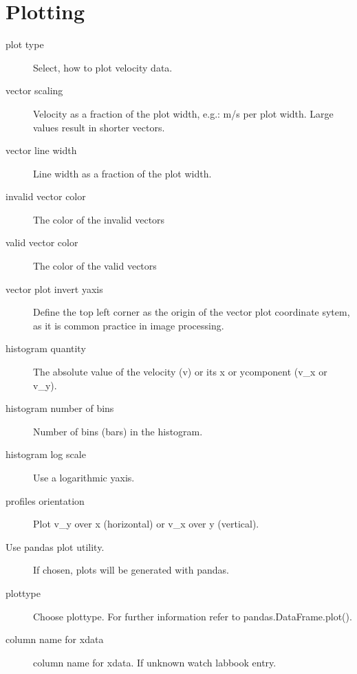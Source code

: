 \documentclass[letterpaper,10pt,english]{sphinxmanual}
\begin{document}
\section{Plotting}
\label{\detokenize{parameters:plotting}}\begin{description}
\item[{plot type}] \leavevmode
Select, how to plot velocity data.

\item[{vector scaling}] \leavevmode
Velocity as a fraction of the plot width, e.g.: m/s per plot width. Large values result in shorter vectors.

\item[{vector line width}] \leavevmode
Line width as a fraction of the plot width.

\item[{invalid vector color}] \leavevmode
The color of the invalid vectors

\item[{valid vector color}] \leavevmode
The color of the valid vectors

\item[{vector plot invert y\sphinxhyphen{}axis}] \leavevmode
Define the top left corner as the origin of the vector plot coordinate sytem, as it is common practice in image processing.

\item[{histogram quantity}] \leavevmode
The absolute value of the velocity (v) or its x\sphinxhyphen{} or y\sphinxhyphen{}component (v\_x or v\_y).

\item[{histogram number of bins}] \leavevmode
Number of bins (bars) in the histogram.

\item[{histogram log scale}] \leavevmode
Use a logarithmic y\sphinxhyphen{}axis.

\item[{profiles orientation}] \leavevmode
Plot v\_y over x (horizontal) or v\_x over y (vertical).

\item[{Use pandas plot utility.}] \leavevmode
If chosen, plots will be generated with pandas.

\item[{plot\sphinxhyphen{}type}] \leavevmode
Choose plot\sphinxhyphen{}type. For further information refer to pandas.DataFrame.plot().

\item[{column name for x\sphinxhyphen{}data}] \leavevmode
column name for x\sphinxhyphen{}data. If unknown watch labbook entry.


\end{description}
\end{document}
